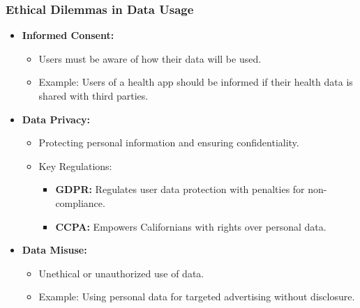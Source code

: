 \documentclass[aspectratio=169]{beamer}
\begin{document}
\begin{frame}[fragile]
    \frametitle{Ethical Dilemmas in Data Usage}
    \begin{itemize}
        \item \textbf{Informed Consent:}
        \begin{itemize}
            \item Users must be aware of how their data will be used.
            \item Example: Users of a health app should be informed if their health data is shared with third parties.
        \end{itemize}
        
        \item \textbf{Data Privacy:}
        \begin{itemize}
            \item Protecting personal information and ensuring confidentiality.
            \item Key Regulations:
            \begin{itemize}
                \item \textbf{GDPR:} Regulates user data protection with penalties for non-compliance.
                \item \textbf{CCPA:} Empowers Californians with rights over personal data.
            \end{itemize}
        \end{itemize}

        \item \textbf{Data Misuse:}
        \begin{itemize}
            \item Unethical or unauthorized use of data.
            \item Example: Using personal data for targeted advertising without disclosure.
        \end{itemize}
    \end{itemize}
\end{frame}
\end{document}
